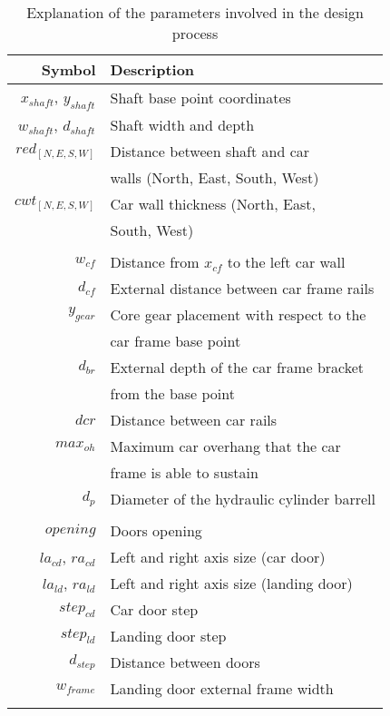 \begin{table}[t]
	\setlength{\tabcolsep}{20pt}
	\caption{\label{tab:param} Explanation of the parameters 
		involved in the design process} 
	\centering
	\begin{tabular}{rl}
		\toprule
		\textbf{Symbol} & \textbf{Description} \\
		\midrule
		$x_{shaft}$, $y_{shaft}$ 	& Shaft base point
		coordinates \\
		$w_{shaft}$, $d_{shaft}$ & Shaft width and depth \\
		$red_{[N, E, S, W]}$ 	 & Distance between shaft and car \\
		& walls (North, East, South, West) \\
		$cwt_{[N, E, S, W]}$ 	 & Car wall thickness (North, East, \\
		& South, West) \\
		& \\
		
		$w_{cf}$ & Distance from $x_{cf}$ to the left car wall \\
		$d_{cf}$ & External distance between car frame rails \\
		$y_{gear}$ & Core gear placement with respect to the \\
		& car frame base point \\
		$d_{br}$ & External depth of the car frame bracket \\
		& from the base point \\
		$dcr$ & Distance between car rails\\
		$max_{oh}$ & Maximum car overhang that the car \\
		& frame is able to sustain \\
		$d_p$ & Diameter of the hydraulic cylinder barrell \\
		& \\
		
		$opening$ & Doors opening \\
		$la_{cd}$, $ra_{cd}$ & Left and right axis size (car door) \\
		$la_{ld}$, $ra_{ld}$ & Left and right axis size (landing door) \\
		$step_{cd}$ & Car door step \\
		$step_{ld}$ & Landing door step \\
		$d_{step}$ & Distance between doors \\
		$w_{frame}$ & Landing door external frame width \\
		& \\
		\bottomrule
	\end{tabular}
\end{table}

